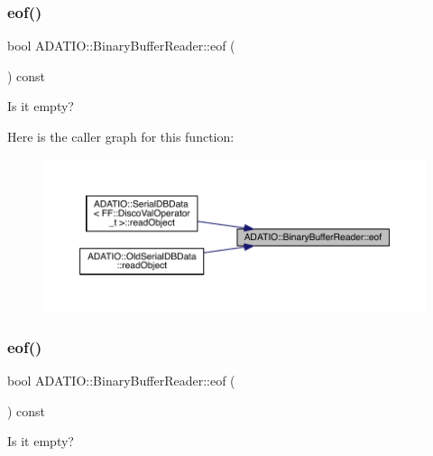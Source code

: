 \subsubsection{\texorpdfstring{eof()}{eof()}\hspace{0.1cm}{\footnotesize\ttfamily [1/3]}}
{\footnotesize\ttfamily bool A\+D\+A\+T\+I\+O\+::\+Binary\+Buffer\+Reader\+::eof (\begin{DoxyParamCaption}{ }\end{DoxyParamCaption}) const}



Is it empty? 

Here is the caller graph for this function\+:
\nopagebreak
\begin{figure}[H]
\begin{center}
\leavevmode
\includegraphics[width=350pt]{d0/df3/classADATIO_1_1BinaryBufferReader_ad7957f285235c272d8874d1ab5ffea75_icgraph}
\end{center}
\end{figure}
\mbox{\label{classADATIO_1_1BinaryBufferReader_ad7957f285235c272d8874d1ab5ffea75}} 
\subsubsection{\texorpdfstring{eof()}{eof()}\hspace{0.1cm}{\footnotesize\ttfamily [2/3]}}
{\footnotesize\ttfamily bool A\+D\+A\+T\+I\+O\+::\+Binary\+Buffer\+Reader\+::eof (\begin{DoxyParamCaption}{ }\end{DoxyParamCaption}) const}



Is it empty? 

\mbox{\label{classADATIO_1_1BinaryBufferReader_ad7957f285235c272d8874d1ab5ffea75}} 
